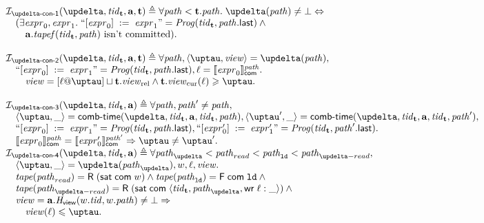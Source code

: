 \[\begin{array}{l}
\invDeltaDefOne(\delta, \tId_{\tT}, \aT, \tT) \triangleq \forall \cpath < \tT.\cpath. \; \delta(\cpath) \not = \bot \Leftrightarrow \\
\quad (\exists \expr_0, \expr_1. \; ``\writeInst{\expr_0}{\expr_1}" = \Cfarm(\tId_{\tT}, \lastInstr{\cpath}) \land {} \\
\quad \quad \aT.\tapef(\tId_{\tT}, \cpath) \text{ isn't committed}). \\
\\
\invDeltaDefTwo(\delta, \tId_{\tT}, \aT, \tT) \triangleq \forall \cpath, \angled{\tau, \R} = \delta(\cpath), \\
\quad ``\writeInst{\expr_0}{\expr_1}" = \Cfarm(\tId_{\tT}, \lastInstr{\cpath}), \loc = \semfcom{\expr_0}{\cpath}. \\
\quad \quad \R = [\loc @ \tau] \sqcup \tT.\Rrel \land \tT.\Rcur(\loc) \ge \tau. \\
\\
\invDeltaDefThree(\delta, \tId_{\tT}, \aT) \triangleq
  \forall \cpath, \cpath' \not = \cpath, \\
\quad \angled{\tau, \_} = \deltaHmap(\delta, \tId_{\tT}, \aT, \tId_{\tT}, \cpath),
  \angled{\tau', \_} = \deltaHmap(\delta, \tId_{\tT}, \aT, \tId_{\tT}, \cpath'), \\
\quad ``\writeInst{\expr_0}{\expr_1}"   = \Cfarm(\tId_{\tT}, \lastInstr{\cpath}),
      ``\writeInst{\expr'_0}{\expr'_1}" = \Cfarm(\tId_{\tT}, \lastInstr{\cpath'}). \\
\quad \semfcom{\expr_0}{\cpath} = \semfcom{\expr'_0}{\cpath'} \Rightarrow \tau \not = \tau'.
\\
\invDeltaDefFour(\delta, \tId_{\tT}, \aT) \triangleq
      \forall \cpath_{\delta} < \cpath_{read} < \cpath_{\LD} < \cpath_{\delta-read}, \\
\quad \angled{\tau, \_} = \delta(\cpath_{\delta}), \w, \loc, \R. \\
\quad \tape(\cpath_{read}) = \tapeRead{(\tapeSatisfied{\Committed}{\w})} \land \tape(\cpath_{\LD}) = \tapeFence{\Committed}{\LD} \land {} \\
\quad \tape(\cpath_{\delta-read}) = \tapeRead{(\tapeSatisfied{\Committed}{\stRequestWrite{\tId_{\tT}}{\cpath_{\delta}}{\loc}{\_}})} \land {} \\
\quad \R = \aT.\rmap(\w.\tId, \w.\cpath) \not = \bot
      \Rightarrow \\
\quad \quad \R(\loc) \le \tau. \\
\end{array}\]

